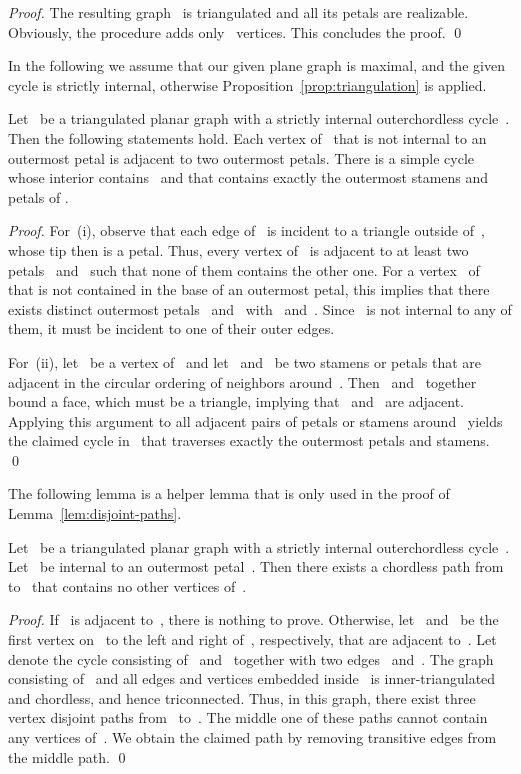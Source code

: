 \documentclass{llncs}
\begin{document}
\begin{proof}
    The resulting graph~ is triangulated and all its petals are
    realizable.  Obviously, the procedure adds only~ vertices.
    This concludes the proof. \qed
  \end{proof}


In the following we assume that our given plane graph is 
maximal, and the given cycle is strictly internal, otherwise 
Proposition~\ref{prop:triangulation} is applied.

\begin{lemma}
  \label{lem:petal-cycle}
  Let~ be a triangulated planar graph with a strictly internal outerchordless
  cycle~.  Then the following statements hold.
   Each vertex of~ that is not internal to an outermost petal is
    adjacent to two outermost petals.  There is a simple cycle~ whose interior contains~ and
    that contains exactly the outermost stamens and petals of .
\end{lemma}

\begin{proof}
  For~(i), observe that each edge of~ is incident to a triangle
  outside of~, whose tip then is a petal.  Thus, every vertex
  of~ is adjacent to at least two petals~ and~ such that
  none of them contains the other one.  For a vertex~ of~ that
  is not contained in the base of an outermost petal, this implies
  that there exists distinct outermost petals~ and~
  with~ and~.  Since~ is not
  internal to any of them, it must be incident to one of their outer
  edges.

  For~(ii), let~ be a vertex of~ and let~ and~ be two
  stamens or petals that are adjacent in the circular ordering of
  neighbors around~.  Then~ and~ together bound a face,
  which must be a triangle, implying that~ and~ are adjacent.
  Applying this argument to all adjacent pairs of petals or stamens
  around~ yields the claimed cycle in~ that traverses exactly
  the outermost petals and stamens.
  \qed
\end{proof}


The following lemma is a helper lemma that is only used in the proof
of Lemma~\ref{lem:disjoint-paths}.

\begin{lemma}
  \label{lem:path-in-petal}
  Let~ be a triangulated planar graph with a strictly internal outerchordless
  cycle~.  Let~ be internal to an
  outermost petal~.  Then there exists a chordless path from~
  to~ that contains no other vertices of~.
\end{lemma}

\begin{proof}
  If~ is adjacent to~, there is nothing to prove.  Otherwise,
  let~ and~ be the first vertex on~ to the left and right
  of~, respectively, that are adjacent to~.  Let~ denote the
  cycle consisting of~ and~ together with two
  edges~ and~.  The graph consisting of~ and all edges
  and vertices embedded inside~ is inner-triangulated and
  chordless, and hence triconnected.  Thus, in this graph, there exist
  three vertex disjoint paths from~ to~.  The middle one of
  these paths cannot contain any vertices of~.  We obtain the
  claimed path by removing transitive edges from the middle path.
\qed
\end{proof}
\end{document}
